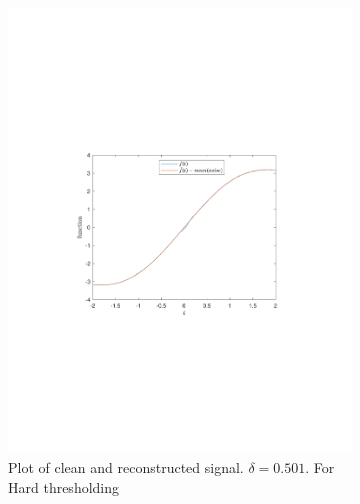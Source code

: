 \documentclass[a4paper]{article}
\begin{document}
\begin{figure}[H]
\begin{subfigure}{0.49\textwidth}
	\includegraphics[trim={3.5cm 8cm 4cm 9cm},clip,width=1\textwidth]{Images/HardFunc.pdf}
	\caption{Plot of clean and reconstructed signal. $\delta = 0.501$. For Hard thresholding}
	\label{sub:BestDeltaFunc}
\end{subfigure}
\begin{subfigure}{0.49\textwidth}
	\centering

\end{subfigure}
\end{figure}
\end{document}
